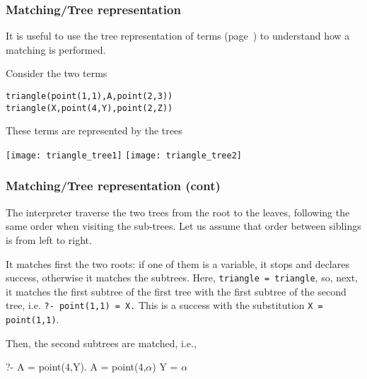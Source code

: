 %
\begin{frame}[containsverbatim]
\frametitle{Matching/Tree representation}

It is useful to use the tree representation of \Prolog terms
(page~\pageref{structures_as_trees}) to understand how a matching is
performed.

\bigskip

Consider the two terms 
{\small
\begin{verbatim}
triangle(point(1,1),A,point(2,3))
triangle(X,point(4,Y),point(2,Z))
\end{verbatim}
}
These terms are represented by the trees
\begin{center}
\texttt{[image: triangle\_tree1]}
\hspace{1cm}
\texttt{[image: triangle\_tree2]}
\end{center}

\end{frame}

%
\begin{frame}
\frametitle{Matching/Tree representation (cont)}

The interpreter traverse the two trees from the root to the leaves,
following the same order when visiting the sub-trees. Let us assume
that order between siblings is from left to right.

\bigskip

It matches first the two roots: if one of them is a variable, it stops
and declares success, otherwise it matches the subtrees. Here,
\texttt{triangle = triangle}, so, next, it matches the first subtree
of the first tree with the first subtree of the second tree,
i.e. \texttt{?- point(1,1) = X.} This is a success with the
substitution \texttt{X = point(1,1)}.

\bigskip

Then, the second subtrees are matched, i.e.,
{\small
\begin{semiverbatim}
?- A = point(4,Y).
A = point(4,\(\alpha\))
Y = \(\alpha\)
\end{semiverbatim}
}

\end{frame}

